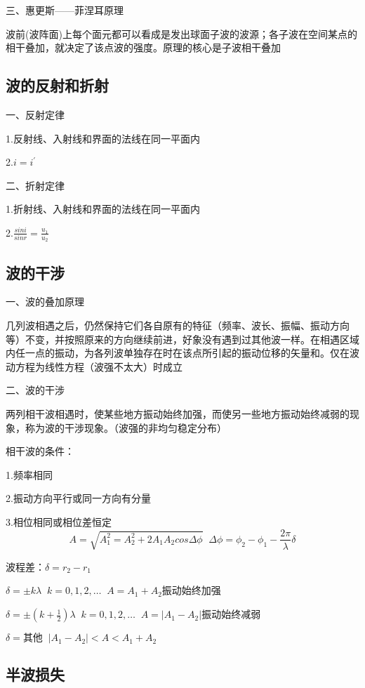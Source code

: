 \documentclass[UTF8]{article}
\begin{document}
    三、惠更斯——菲涅耳原理

    波前(波阵面)上每个面元都可以看成是发出球面子波的波源；各子波在空间某点的相干叠加，就决定了该点波的强度。原理的核心是子波相干叠加

\subsection{波的反射和折射}

    一、反射定律

    1.反射线、入射线和界面的法线在同一平面内

    2.$i = i^{'}$

    二、折射定律

    1.折射线、入射线和界面的法线在同一平面内

    2.$\frac{sin i}{sin r} = \frac{u_1}{u_2}$

\subsection{波的干涉}

    一、波的叠加原理

    几列波相遇之后，仍然保持它们各自原有的特征（频率、波长、振幅、振动方向等）不变，并按照原来的方向继续前进，好象没有遇到过其他波一样。在相遇区域内任一点的振动，为各列波单独存在时在该点所引起的振动位移的矢量和。仅在波动方程为线性方程（波强不太大）时成立

    二、波的干涉

    两列相干波相遇时，使某些地方振动始终加强，而使另一些地方振动始终减弱的现象，称为波的干涉现象。（波强的非均匀稳定分布）

    相干波的条件：

    \;\;1.频率相同

    \;\;2.振动方向平行或同一方向有分量

    \;\;3.相位相同或相位差恒定
    \[A = \sqrt{A_1^2 = A_2^2+ 2A_1A_2cos\Delta\phi}\;\;\Delta\phi = \phi_2 - \phi_1 - \frac{2\pi}{\lambda}\delta\]

    波程差：$\delta = r_2 - r_1$

    $\delta = \pm k\lambda\;\;k = 0, 1, 2,\dots\;\;A = A_1 + A_2$\;\;振动始终加强

    $\delta = \pm(k + \frac{1}{2})\lambda\;\;k = 0, 1, 2,\dots\;\;A = \vert A_1 - A_2\lvert $\;\;振动始终减弱

    $\delta = \mbox{其他}\;\;\vert A_1 - A_2 \lvert < A < A_1 + A_2$

\subsection{半波损失}
\end{document}
